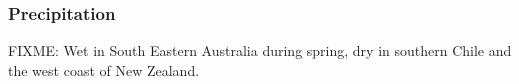 \subsubsection{Precipitation}

FIXME: Wet in South Eastern Australia during spring, dry in southern Chile and the west coast of New Zealand.
